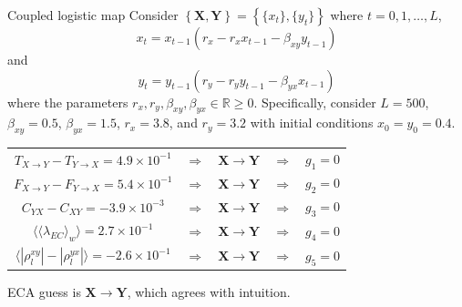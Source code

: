 \documentclass{beamer}
\begin{document}
\begin{frame}{Coupled logistic map}
Consider $\left\{\mathbf{X},\mathbf{Y}\right\} = \left\{\{x_t\},\{y_t\}\right\}$ where $t=0,1,\ldots,L$,
\begin{equation*}
x_t = x_{t-1}\left(r_x-r_x x_{t-1}-\beta_{xy} y_{t-1}\right)
\end{equation*}
and
\begin{equation*}
y_t = y_{t-1}\left(r_y-r_y y_{t-1}-\beta_{yx} x_{t-1}\right)
\end{equation*}
where the parameters $r_x,r_y,\beta_{xy},\beta_{yx}\in\mathbb{R}\ge 0$.  Specifically, consider $L=500$, $\beta_{xy} = 0.5$, $\beta_{yx} = 1.5$, $r_x = 3.8$, and $r_y = 3.2$ with initial conditions $x_0 = y_0 = 0.4$.
\begin{center}
\begin{tabular}{ccccc}
$T_{X\rightarrow Y}-T_{Y\rightarrow X} =4.9\times 10^{-1}$&$\Rightarrow$&$\mathbf{X}\rightarrow\mathbf{Y}$&$\Rightarrow$&$g_1 = 0$\\
$F_{X\rightarrow Y}-F_{Y\rightarrow X}=5.4\times 10^{-1}$&$\Rightarrow$&$\mathbf{X}\rightarrow\mathbf{Y}$&$\Rightarrow$&$g_2 = 0$\\
$C_{YX}-C_{XY}=-3.9\times 10^{-3}$&$\Rightarrow$&$\mathbf{X}\rightarrow\mathbf{Y}$&$\Rightarrow$&$g_3 = 0$\\
$\langle\langle\lambda_{EC}\rangle_w\rangle=2.7\times 10^{-1}$&$\Rightarrow$&$\mathbf{X}\rightarrow\mathbf{Y}$&$\Rightarrow$&$g_4 = 0$\\
$\langle|\rho^{xy}_l| - |\rho^{yx}_l|\rangle=-2.6\times 10^{-1}$&$\Rightarrow$&$\mathbf{X}\rightarrow\mathbf{Y}$&$\Rightarrow$&$g_5 = 0$
\end{tabular}
\end{center}
ECA guess is $\mathbf{X}\rightarrow\mathbf{Y}$, which agrees with intuition.
\end{frame}
\end{document}
